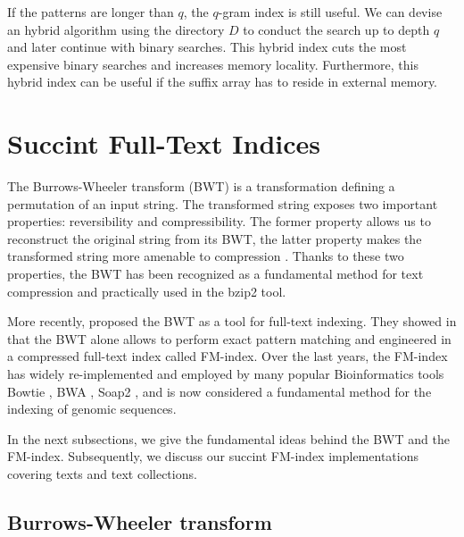 If the patterns are longer than $q$, the $q$-gram index is still useful.
We can devise an hybrid algorithm using the directory $D$ to conduct the search up to depth $q$ and later continue with binary searches.
This hybrid index cuts the most expensive binary searches and increases memory locality.
Furthermore, this hybrid index can be useful if the suffix array has to reside in external memory.


\section{Succint Full-Text Indices}

The Burrows-Wheeler transform (BWT) \citep{Burrows1994} is a transformation defining a permutation of an input string.
The transformed string exposes two important properties: reversibility and compressibility.
The former property allows us to reconstruct the original string from its BWT, the latter property makes the transformed string more amenable to compression \citep{?}.
Thanks to these two properties, the BWT has been recognized as a fundamental method for text compression and practically used in the bzip2 \citep{?} tool.

More recently, \citeauthor{Ferragina2000} proposed the BWT as a tool for full-text indexing.
They showed in \citep{Ferragina2000} that the BWT alone allows to perform exact pattern matching and engineered in \citep{Ferragina2001} a compressed full-text index called FM-index.
Over the last years, the FM-index has widely re-implemented and employed by many popular Bioinformatics tools \eg Bowtie \citep{Bowtie}, BWA \citep{BWA}, Soap2 \citep{Soap2}, and is now considered a fundamental method for the indexing of genomic sequences.

In the next subsections, we give the fundamental ideas behind the BWT and the FM-index.
Subsequently, we discuss our succint FM-index implementations covering texts and text collections.

\subsection{Burrows-Wheeler transform}

